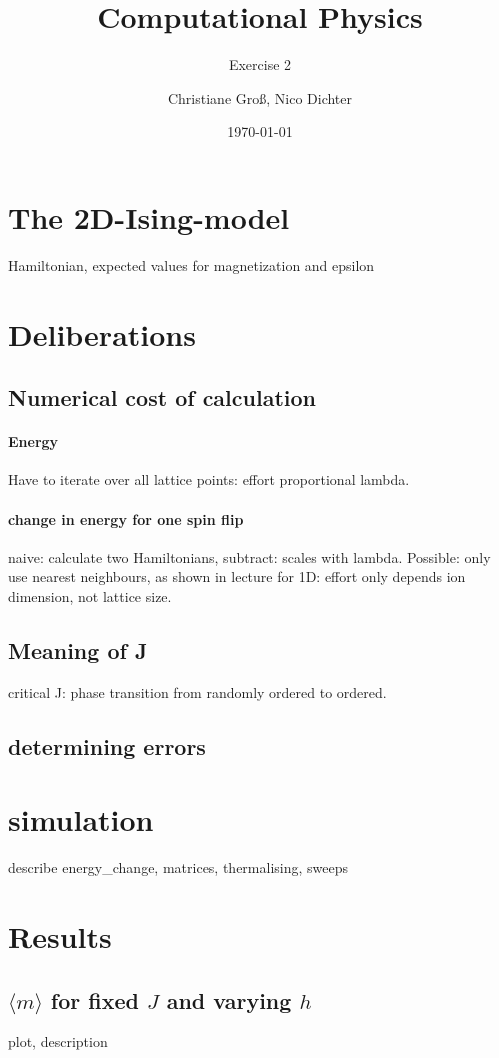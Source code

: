\documentclass{scrartcl}
\title{Computational Physics}
\subtitle{Exercise 2}
\date{\today}
\author{Christiane Groß, Nico Dichter}
\begin{document}
	\maketitle
\section{The 2D-Ising-model}
Hamiltonian, expected values for magnetization and epsilon

\section{Deliberations}
\subsection{Numerical cost of calculation}
\paragraph{Energy} Have to iterate over all lattice points: effort proportional lambda.

\paragraph{change in energy for one spin flip}
naive: calculate two Hamiltonians, subtract: scales with lambda. 
Possible: only use nearest neighbours, as shown in lecture for 1D: effort only depends ion dimension, not lattice size.

\subsection{Meaning of J} critical J: phase transition from randomly ordered to ordered.

\subsection{determining errors}

\section{simulation}
describe energy\_change, matrices, thermalising, sweeps

\section{Results}

\subsection{$\langle m\rangle$ for fixed $J$ and varying $h$}
plot, description
\end{document}
